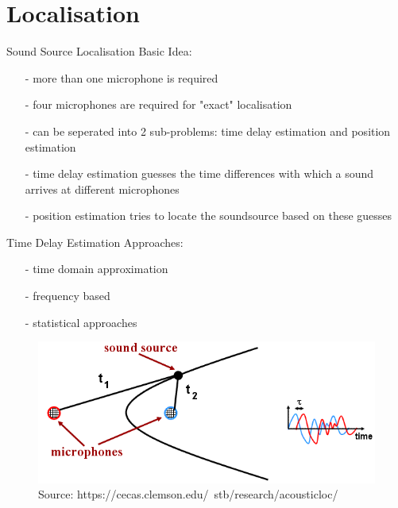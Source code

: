 \documentclass{beamer}
\begin{document}
	\section{Localisation}%
	
	\begin{frame}{Sound Source Localisation}
		Basic Idea:
		\begin{itemize}
			\item[-] more than one microphone is required
			\item[-] four microphones are required for "exact" localisation
			\item[-] can be seperated into 2 sub-problems: time delay estimation and position estimation
			\item[-] time delay estimation guesses the time differences with which a sound arrives at different microphones
			\item[-] position estimation  tries to locate the soundsource based on these guesses
		\end{itemize}
	\end{frame}
	
	\begin{frame}{Time Delay Estimation}
		Approaches:
		\begin{itemize}[leftmargin=*,labelindent=16pt]
			\item[-] time domain approximation
			\item[-] frequency based
			\item[-] statistical approaches
		\end{itemize}
		
		\begin{figure}[ht]
			\centering
			\includegraphics[width=.8\linewidth]{Bilder/ssl.png}
			\caption{Source: https://cecas.clemson.edu/~stb/research/acousticloc/}
		\end{figure}
	\end{frame}
	
\end{document}
